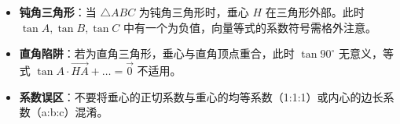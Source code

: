 \begin{trapbox}
\begin{itemize}
    \item \textbf{钝角三角形}：当 $\triangle ABC$ 为钝角三角形时，垂心 $H$ 在三角形外部。此时 $\tan A, \tan B, \tan C$ 中有一个为负值，向量等式的系数符号需格外注意。
    \item \textbf{直角陷阱}：若为直角三角形，垂心与直角顶点重合，此时 $\tan 90^\circ$ 无意义，等式 $\tan A \cdot \vec{HA} + \dots = \vec{0}$ 不适用。
    \item \textbf{系数误区}：不要将垂心的正切系数与重心的均等系数（1:1:1）或内心的边长系数（a:b:c）混淆。
\end{itemize}
\end{trapbox}